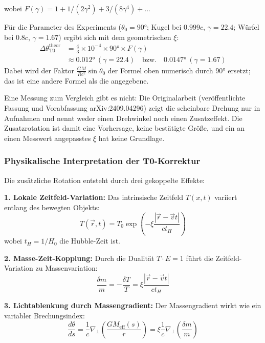 	wobei $F(\gamma) = 1 + 1/(2\gamma^2) + 3/(8\gamma^4) + ...$ 
	
	Für die Parameter des Experiments ($\theta_0 = 90°$; Kugel bei $0.999c$, $\gamma = 22.4$; Würfel bei $0.8c$, $\gamma = 1.67$) ergibt sich mit dem geometrischen $\xi$:
	\begin{align}
		\Delta\theta_{\text{T0}}^{\text{theor}} &= \frac{4}{3} \times 10^{-4} \times 90° \times F(\gamma) \\
		&\approx 0.012° \ (\gamma = 22.4) \quad \text{bzw.} \quad 0.0147° \ (\gamma = 1.67)
	\end{align}
	Dabei wird der Faktor $\frac{GM}{Rc^2}\sin\theta_0$ der Formel oben numerisch durch $90°$ ersetzt; das ist eine andere Formel als die angegebene.
	
	Eine Messung zum Vergleich gibt es nicht: Die Originalarbeit \cite{terrell2025} (veröffentlichte Fassung und Vorabfassung arXiv:2409.04296) zeigt die scheinbare Drehung nur in Aufnahmen und nennt weder einen Drehwinkel noch einen Zusatzeffekt. Die Zusatzrotation ist damit eine Vorhersage, keine bestätigte Größe, und ein an einen Messwert angepasstes $\xi$ hat keine Grundlage.
	
	\subsubsection{Physikalische Interpretation der T0-Korrektur}
	
	Die zusätzliche Rotation entsteht durch drei gekoppelte Effekte:
	
	\textbf{1. Lokale Zeitfeld-Variation:}
	Das intrinsische Zeitfeld $T(x,t)$ variiert entlang des bewegten Objekts:
	\begin{equation}
		T(\vec{r}, t) = T_0 \exp\left(-\xi \frac{|\vec{r} - \vec{v}t|}{ct_H}\right)
	\end{equation}
	wobei $t_H = 1/H_0$ die Hubble-Zeit ist.
	
	\textbf{2. Masse-Zeit-Kopplung:}
	Durch die Dualität $T \cdot E = 1$ führt die Zeitfeld-Variation zu Massenvariation:
	\begin{equation}
		\frac{\delta m}{m} = -\frac{\delta T}{T} = \xi \frac{|\vec{r} - \vec{v}t|}{ct_H}
	\end{equation}
	
	\textbf{3. Lichtablenkung durch Massengradient:}
	Der Massengradient wirkt wie ein variabler Brechungsindex:
	\begin{equation}
		\frac{d\theta}{ds} = \frac{1}{c} \nabla_\perp \left(\frac{GM_{\text{eff}}(s)}{r}\right) = \xi \frac{1}{c} \nabla_\perp \left(\frac{\delta m}{m}\right)
	\end{equation}
	
